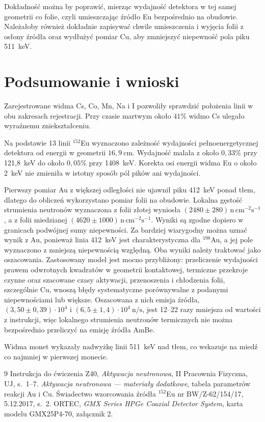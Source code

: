 \documentclass[twocolumn,a4paper,10pt]{article}
\begin{document}
Dokładność można by poprawić, mierząc wydajność
detektora w tej samej geometrii co folie, czyli
umieszczając źródło Eu bezpośrednio na obudowie.
Należałoby również dokładnie zapisywać chwile
umieszczenia i wyjęcia folii z osłony źródła oraz
wydłużyć pomiar Cu, aby zmniejszyć niepewność pola
piku 511~keV.

\section{Podsumowanie i wnioski}
Zarejestrowane widma Cs, Co, Mn, Na i I pozwoliły
sprawdzić położenia linii w obu zakresach rejestracji.
Przy czasie martwym około $41\%$ widmo Cs ulegało
wyraźnemu zniekształceniu.

Na podstawie 13 linii $^{152}$Eu wyznaczono
zależność wydajności pełnoenergetycznej detektora
od energii w geometrii $16{,}9~\mathrm{cm}$.
Wydajność malała z około $0{,}33\%$ przy 121,8~keV
do około $0{,}05\%$ przy 1408~keV. Korekta osi
energii widma Eu o około 2~keV nie zmieniła
w istotny sposób pól pików ani wydajności.

Pierwszy pomiar Au z większej odległości nie
ujawnił piku 412~keV ponad tłem, dlatego do obliczeń
wykorzystano pomiar folii na obudowie. Lokalna
gęstość strumienia neutronów wyznaczona z folii
złotej wyniosła $(2480\pm280)\,\mathrm{n\,cm^{-2}s^{-1}}$,
a z folii miedzianej
$(4620\pm1000)\,\mathrm{n\,cm^{-2}s^{-1}}$.
Wyniki są zgodne dopiero w granicach podwójnej
sumy niepewności. Za bardziej wiarygodny można
uznać wynik z Au, ponieważ linia 412~keV jest
charakterystyczna dla $^{198}$Au, a jej pole
wyznaczono z mniejszą niepewnością względną.
Oba wyniki należy traktować jako oszacowania.
Zastosowany model jest mocno przybliżony:
przeliczenie wydajności prawem odwrotnych
kwadratów w geometrii kontaktowej, termiczne
przekroje czynne oraz szacowane czasy aktywacji,
przenoszenia i chłodzenia folii, szczególnie Cu,
wnoszą błędy systematyczne porównywalne z podanymi
niepewnościami lub większe. Oszacowana z nich
emisja źródła, $(3{,}50\pm0{,}39)\cdot10^4$
i $(6{,}5\pm1{,}4)\cdot10^4~\mathrm{n/s}$, jest
12--22 razy mniejsza od wartości z instrukcji,
więc lokalnego strumienia neutronów termicznych
nie można bezpośrednio przeliczyć na emisję
źródła AmBe.

Widma monet wykazały nadwyżkę linii 511~keV nad tłem,
co wskazuje na miedź co najmniej w pierwszej monecie.

{\small\begin{thebibliography}{9}
 Instrukcja do ćwiczenia Z40,
\emph{Aktywacja neutronowa}, II Pracownia Fizyczna, UJ, s.~1--7.
 \emph{Aktywacja neutronowa — materiały
dodatkowe}, tabela parametrów reakcji Au i Cu.
 Świadectwo wzorcowania źródła
$^{152}$Eu nr BW/Z-62/154/17, 5.12.2017, s.~2.
 ORTEC, \emph{GMX Series HPGe Coaxial
Detector System}, karta modelu GMX25P4-70, załącznik 2.
\end{thebibliography}}
\end{document}

